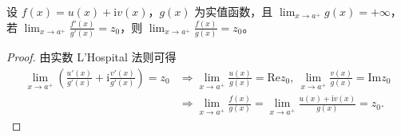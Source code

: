 \documentclass[../../main.tex]{subfiles}%
\begin{document}
\begin{proposition}\label{proposition:L'Hospital法则(复变函数版本)}
设 \( f(x) = u(x) + \mathrm{i} v(x) \)，\( g(x) \) 为实值函数，且 \( \lim_{x \to a^+} g(x) = +\infty \)，若 \( \lim_{x \to a^+} \frac{f'(x)}{g'(x)} = z_0 \)，则 \( \lim_{x \to a^+} \frac{f(x)}{g(x)} = z_0 \)。
\end{proposition}
\begin{proof}

由实数 L’Hospital 法则可得
\begin{align*}
\lim_{x \to a^+} \left( \frac{u'(x)}{g'(x)} + \mathrm{i} \frac{v'(x)}{g'(x)} \right) = z_0 &\Rightarrow \lim_{x \to a^+} \frac{u(x)}{g(x)} = \mathrm{Re} z_0,\ \lim_{x \to a^+} \frac{v(x)}{g(x)} = \mathrm{Im} z_0 \\
&\Rightarrow \lim_{x \to a^+} \frac{f(x)}{g(x)} = \lim_{x \to a^+} \frac{u(x) + \mathrm{i} v(x)}{g(x)} = z_0.
\end{align*} 

\end{proof}
\end{document}
